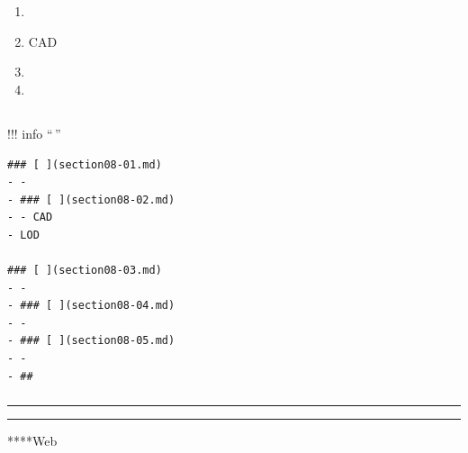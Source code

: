 \section{}\label{section}

\subsection{}\label{section-1}

\begin{enumerate}
\def\labelenumi{\arabic{enumi}.}
\tightlist
\item
\item
  CAD
\item
\item
\end{enumerate}

\subsection{}\label{section-2}

\subsection{}\label{section-3}

!!! info ``\,''

\begin{verbatim}
### [ ](section08-01.md)
- - 
- ### [ ](section08-02.md)
- - CAD
- LOD

### [ ](section08-03.md)
- - 
- ### [ ](section08-04.md)
- - 
- ### [ ](section08-05.md)
- - 
- ## 
\end{verbatim}

\subsubsection{}\label{section-4}

\begin{center}\rule{0.5\linewidth}{0.5pt}\end{center}

\begin{center}\rule{0.5\linewidth}{0.5pt}\end{center}

****Web

\subsubsection{}\label{section-5}

